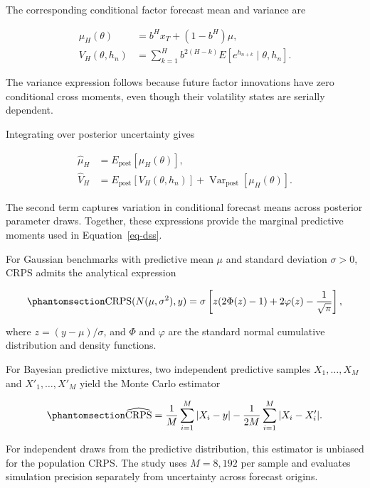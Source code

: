 \documentclass[
  12pt,
  letterpaper,
  DIV=11,
  numbers=noendperiod]{scrreprt}
\begin{document}
The corresponding conditional factor forecast mean and variance are

\[
\begin{aligned}
\mu_H(\theta)
&=b^Hx_T+(1-b^H)\mu,\\
V_H(\theta,h_n)
&=\sum_{k=1}^{H}
b^{2(H-k)}
E[e^{h_{n+k}}\mid\theta,h_n].
\end{aligned}
\]

The variance expression follows because future factor innovations have
zero conditional cross moments, even though their volatility states are
serially dependent.

Integrating over posterior uncertainty gives

\[
\begin{aligned}
\widehat\mu_H
&=E_{\mathrm{post}}[\mu_H(\theta)],\\
\widehat V_H
&=E_{\mathrm{post}}[V_H(\theta,h_n)]
+\operatorname{Var}_{\mathrm{post}}[\mu_H(\theta)].
\end{aligned}
\]

The second term captures variation in conditional forecast means across
posterior parameter draws. Together, these expressions provide the
marginal predictive moments used in Equation~\ref{eq-dss}.

For Gaussian benchmarks with predictive mean \(\mu\) and standard
deviation \(\sigma>0\), CRPS admits the analytical expression

\begin{equation}\protect\phantomsection\label{eq-crps-gaussian}{
\operatorname{CRPS}(N(\mu,\sigma^2),y)
=
\sigma\left[
z(2\Phi(z)-1)
+2\varphi(z)-\frac1{\sqrt\pi}
\right],
}\end{equation}

where \(z=(y-\mu)/\sigma\), and \(\Phi\) and \(\varphi\) are the
standard normal cumulative distribution and density functions.

For Bayesian predictive mixtures, two independent predictive samples
\(X_1,\ldots,X_M\) and \(X'_1,\ldots,X'_M\) yield the Monte Carlo
estimator

\begin{equation}\protect\phantomsection\label{eq-crps-mc}{
\widehat{\operatorname{CRPS}}
=
\frac1M\sum_{i=1}^{M}|X_i-y|
-\frac1{2M}\sum_{i=1}^{M}|X_i-X'_i|.
}\end{equation}

For independent draws from the predictive distribution, this estimator
is unbiased for the population CRPS. The study uses \(M=8{,}192\) per
sample and evaluates simulation precision separately from uncertainty
across forecast origins.
\end{document}
